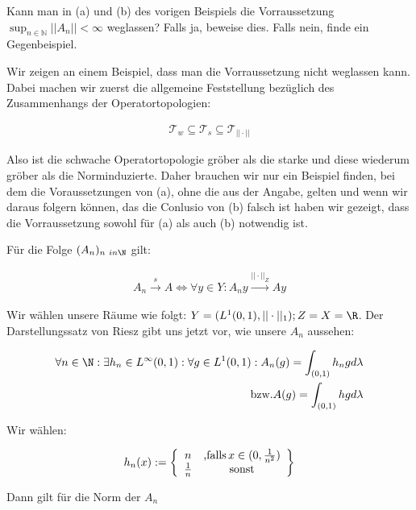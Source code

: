 \begin{exercise}
Kann man in (a) und (b) des vorigen Beispiels die Vorraussetzung
$\sup_{n \in \mathbb{N}} ||A_n|| < \infty$ weglassen?
Falls ja, beweise dies. Falls nein, finde ein Gegenbeispiel.
\end{exercise}
\begin{solution}

Wir zeigen an einem Beispiel, dass man die Vorraussetzung nicht weglassen kann.
Dabei machen wir zuerst die allgemeine Feststellung bezüglich des Zusammenhangs der
Operatortopologien:

\begin{align*}
  \mathcal{T}_w \subseteq \mathcal{T}_s \subseteq \mathcal{T}_{||\cdot||}
\end{align*}

Also ist die schwache Operatortopologie gröber als die starke und diese wiederum
gröber als die Norminduzierte. Daher brauchen wir nur ein Beispiel finden, bei dem
die Voraussetzungen von (a), ohne die aus der Angabe, gelten und wenn wir daraus folgern können, das die Conlusio von (b) falsch ist haben wir gezeigt, dass die Vorraussetzung sowohl
für (a) als auch (b) notwendig ist.

Für die Folge $(A_n)_{n \ in \N}$ gilt:

\begin{align*}
  A_n \stackrel{s}{\rightarrow} A
  \Leftrightarrow
  \forall y \in Y: A_n y \stackrel{||\cdot||_Z}{\rightarrow} Ay
\end{align*}

Wir wählen unsere Räume wie folgt: $Y = (L^1 (0,1), ||\cdot||_1) ; Z=X=\R$. Der
Darstellungssatz von Riesz gibt uns jetzt vor, wie unsere $A_n$ aussehen:

\begin{align*}
  \forall n \in \N: \exists h_n \in L^{\infty}(0,1):
  \forall g \in L^1 (0,1): A_n(g) = \int_{(0,1)}h_n g d\lambda \\
  \text{bzw.} A(g)= \int_{(0,1)} hg d\lambda
\end{align*}

Wir wählen:

\begin{align*}
  h_n (x):= \left\{
  \begin{array}{cc}
    n & \text{,falls\,} x \in (0,\frac{1}{n^2}) \\
    \frac{1}{n} & \text{sonst}
  \end{array}
  \right\}
\end{align*}

Dann gilt für die Norm der $A_n$

\end{solution}
